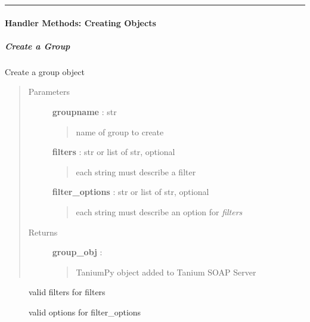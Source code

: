 \documentclass[letterpaper,10pt,english]{sphinxmanual}
\begin{document}
\bigskip\hrule{}\bigskip



\paragraph{Handler Methods: Creating Objects}
\label{pytan.handler:handler-methods-creating-objects}

\subparagraph{Create a Group}
\label{pytan.handler:create-a-group}

\begin{fulllineitems}
\label{pytan.handler:pytan.handler.Handler.create_group}
Create a group object
\begin{quote}\begin{description}
\item[{Parameters}] \leavevmode
\textbf{groupname} : str
\begin{quote}

name of group to create
\end{quote}

\textbf{filters} : str or list of str, optional
\begin{quote}

each string must describe a filter
\end{quote}

\textbf{filter\_options} : str or list of str, optional
\begin{quote}

each string must describe an option for \emph{filters}
\end{quote}

\item[{Returns}] \leavevmode
\textbf{group\_obj} : {\hyperref[taniumpy.object_types:taniumpy.object_types.group.Group]{}}
\begin{quote}

TaniumPy object added to Tanium SOAP Server
\end{quote}

\end{description}\end{quote}



\begin{description}
\item[{{\hyperref[pytan.constants:pytan.constants.FILTER_MAPS]{}}}] \leavevmode
valid filters for filters

\item[{{\hyperref[pytan.constants:pytan.constants.OPTION_MAPS]{}}}] \leavevmode
valid options for filter\_options

\end{description}



\end{fulllineitems}
\end{document}
